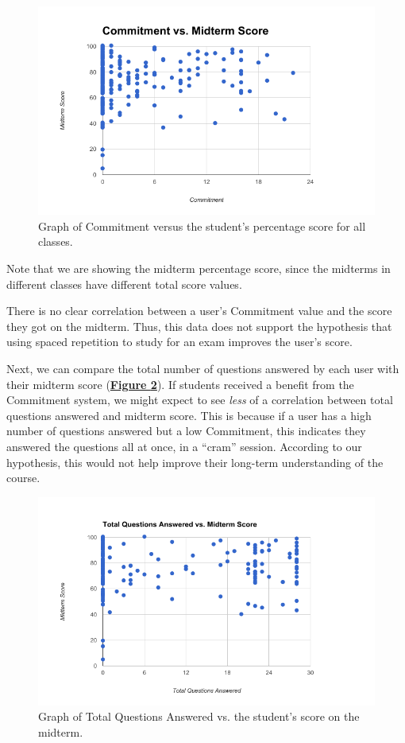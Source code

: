  \begin{figure}[ht]
 	\includegraphics[width=1.0\linewidth]{figures/commitment-data1}
 	\caption{Graph of Commitment versus the student's percentage score for all classes.}
 	\label{fig:comm_vs_score}
 \end{figure}

\par Note that we are showing the midterm percentage score, since the midterms in different classes have different total score values.
\par There is no clear correlation between a user's Commitment value and the score they got on the midterm. Thus, this data does not support the hypothesis that using spaced repetition to study for an exam improves the user's score.

\par  Next, we can compare the total number of questions answered by each user with their midterm score (\textbf{\hyperref[fig:cramming]{Figure \ref*{fig:cramming}}}). If students received a benefit from the Commitment system, we might expect to see \textit{less} of a correlation between total questions answered and midterm score. This is because if a user has a high number of questions answered but a low Commitment, this indicates they answered the questions all at once, in a ``cram'' session. According to our hypothesis, this would not help improve their long-term understanding of the course.

\begin{figure}[ht]
	\includegraphics[width=1.0\linewidth]{figures/cramming-data}
	\caption{Graph of Total Questions Answered vs. the student's score on the midterm.}
	\label{fig:cramming}
\end{figure}
 
